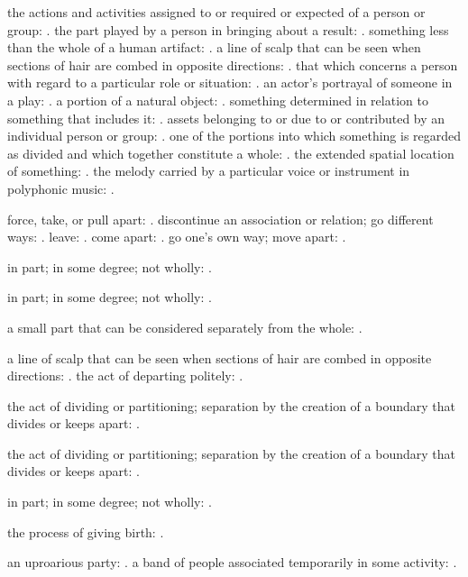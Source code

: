   the actions and activities assigned to or required or expected of a person or group: . the part played by a person in bringing about a result: . something less than the whole of a human artifact: . a line of scalp that can be seen when sections of hair are combed in opposite directions: . that which concerns a person with regard to a particular role or situation: . an actor's portrayal of someone in a play: . a portion of a natural object: . something determined in relation to something that includes it: . assets belonging to or due to or contributed by an individual person or group: . one of the portions into which something is regarded as divided and which together constitute a whole: . the extended spatial location of something: . the melody carried by a particular voice or instrument in polyphonic music: .

  force, take, or pull apart: . discontinue an association or relation; go different ways: . leave: . come apart: . go one's own way; move apart: .

  in part; in some degree; not wholly: .

  in part; in some degree; not wholly: .

  a small part that can be considered separately from the whole: .

  a line of scalp that can be seen when sections of hair are combed in opposite directions: . the act of departing politely: .

  the act of dividing or partitioning; separation by the creation of a boundary that divides or keeps apart: .

  the act of dividing or partitioning; separation by the creation of a boundary that divides or keeps apart: .

  in part; in some degree; not wholly: .

  the process of giving birth: .

  an uproarious party: . a band of people associated temporarily in some activity: .

